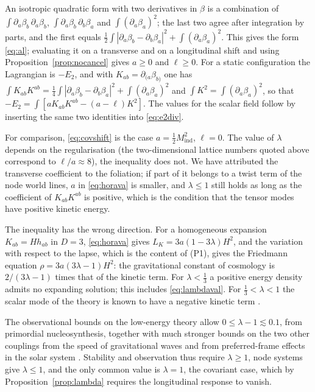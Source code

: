 \documentclass[11pt,a4paper]{article}
\makeatletter
\theoremstyle{stmt}
\theoremstyle{defn}
\theoremstyle{rmk}
\renewenvironment{proof}[1][\proofname]{\par\pushQED{\qed}\normalfont\topsep6\p@\@plus6\p@\relax
  \trivlist\item[\hskip\labelsep{\sffamily\itshape\small #1.}]\ignorespaces}{\popQED\endtrivlist\@endpefalse}
\numberwithin{equation}{section}
\makeatother
\begin{document}
\begin{proof}
An isotropic quadratic form with two derivatives in $\beta$ is a combination of $\int\partial_a\beta_b\,\partial_a\beta_b$, $\int\partial_a\beta_b\,\partial_b\beta_a$ and $\int(\partial_a\beta_a)^2$; the last two agree after integration by parts, and the first equals $\tfrac12\int|\partial_a\beta_b-\partial_b\beta_a|^2+\int(\partial_a\beta_a)^2$. This gives the form \eqref{eq:al}; evaluating it on a transverse and on a longitudinal shift and using Proposition~\ref{prop:nocancel} gives $a\ge0$ and $\ell\ge0$. For a static configuration the Lagrangian is $-E_2$, and with $K_{ab}=\partial_{(a}\beta_{b)}$ one has $\int K_{ab}K^{ab}=\tfrac14\int|\partial_a\beta_b-\partial_b\beta_a|^2+\int(\partial_a\beta_a)^2$ and $\int K^2=\int(\partial_a\beta_a)^2$, so that $-E_2=\int[aK_{ab}K^{ab}-(a-\ell)K^2]$. The values for the scalar field follow by inserting the same two identities into \eqref{eq:e2div}.
\end{proof}

For comparison, \eqref{eq:covshift} is the case $a=\tfrac12M_{\mathrm{ind}}^2$, $\ell=0$. The value of $\lambda$ depends on the regularisation (the two-dimensional lattice numbers quoted above correspond to $\ell/a\approx8$), the inequality does not. We have attributed the transverse coefficient to the foliation; if part of it belongs to a twist term of the node world lines, $a$ in \eqref{eq:horava} is smaller, and $\lambda\le1$ still holds as long as the coefficient of $K_{ab}K^{ab}$ is positive, which is the condition that the tensor modes have positive kinetic energy.

The inequality has the wrong direction. For a homogeneous expansion $K_{ab}=Hh_{ab}$ in $D=3$, \eqref{eq:horava} gives $L_K=3a(1-3\lambda)H^2$, and the variation with respect to the lapse, which is the content of (P1), gives the Friedmann equation $\rho=3a(3\lambda-1)H^2$: the gravitational constant of cosmology is $2/(3\lambda-1)$ times that of the kinetic term. For $\lambda<\tfrac13$ a positive energy density admits no expanding solution; this includes \eqref{eq:lambdaval}. For $\tfrac13<\lambda<1$ the scalar mode of the theory is known to have a negative kinetic term \cite{GM}.

The observational bounds on the low-energy theory allow $0\le\lambda-1\lesssim0.1$, from primordial nucleosynthesis, together with much stronger bounds on the two other couplings from the speed of gravitational waves and from preferred-frame effects in the solar system \cite{GSS,OMW}. Stability and observation thus require $\lambda\ge1$, node systems give $\lambda\le1$, and the only common value is $\lambda=1$, the covariant case, which by Proposition~\ref{prop:lambda} requires the longitudinal response to vanish.
\end{document}
